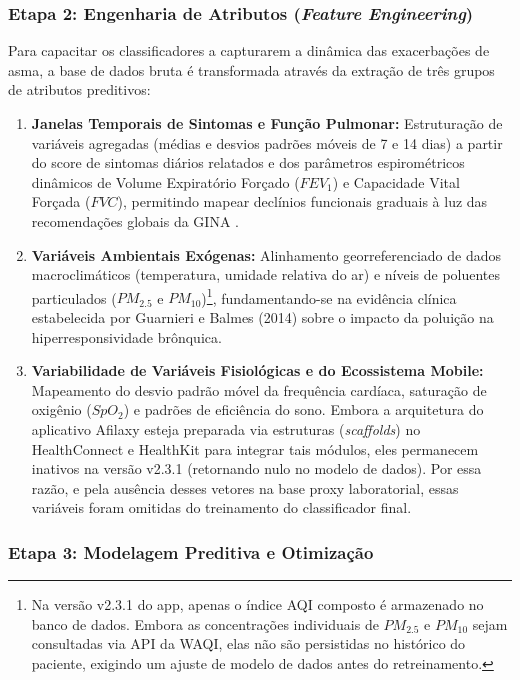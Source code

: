 \documentclass[12pt]{article}
\begin{document}
\subsubsection{Etapa 2: Engenharia de Atributos (\textit{Feature Engineering})}
Para capacitar os classificadores a capturarem a dinâmica das exacerbações de asma, a base de dados bruta é transformada através da extração de três grupos de atributos preditivos:
\begin{enumerate}
    \item \textbf{Janelas Temporais de Sintomas e Função Pulmonar:} Estruturação de variáveis agregadas (médias e desvios padrões móveis de 7 e 14 dias) a partir do score de sintomas diários relatados e dos parâmetros espirométricos dinâmicos de Volume Expiratório Forçado ($FEV_1$) e Capacidade Vital Forçada ($FVC$), permitindo mapear declínios funcionais graduais à luz das recomendações globais da GINA \cite{ginasthma2024}.
    \item \textbf{Variáveis Ambientais Exógenas:} Alinhamento georreferenciado de dados macroclimáticos (temperatura, umidade relativa do ar) e níveis de poluentes particulados ($PM_{2.5}$ e $PM_{10}$)\footnote{Na versão v2.3.1 do app, apenas o índice AQI composto é armazenado no banco de dados. Embora as concentrações individuais de $PM_{2.5}$ e $PM_{10}$ sejam consultadas via API da WAQI, elas não são persistidas no histórico do paciente, exigindo um ajuste de modelo de dados antes do retreinamento.}, fundamentando-se na evidência clínica estabelecida por Guarnieri e Balmes (2014) sobre o impacto da poluição na hiperresponsividade brônquica.
    \item \textbf{Variabilidade de Variáveis Fisiológicas e do Ecossistema Mobile:} Mapeamento do desvio padrão móvel da frequência cardíaca, saturação de oxigênio ($SpO_2$) e padrões de eficiência do sono. Embora a arquitetura do aplicativo Afilaxy esteja preparada via estruturas (\textit{scaffolds}) no HealthConnect e HealthKit para integrar tais módulos, eles permanecem inativos na versão v2.3.1 (retornando nulo no modelo de dados). Por essa razão, e pela ausência desses vetores na base proxy laboratorial, essas variáveis foram omitidas do treinamento do classificador final.
\end{enumerate}

\subsubsection{Etapa 3: Modelagem Preditiva e Otimização}
\end{document}
